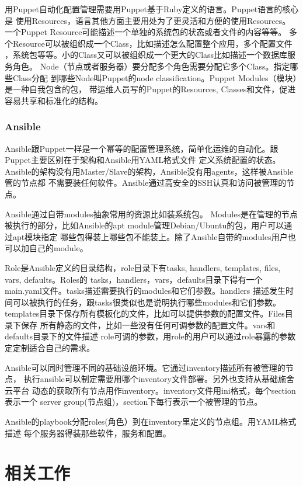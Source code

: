 用Puppet自动化配置管理需要用Puppet基于Ruby定义的语言。Puppet语言的核心是
使用Resources，语言其他方面主要用处为了更灵活和方便的使用Resources。
一个Puppet Resource可能描述一个单独的系统包的状态或者文件的内容等等。
多个Resource可以被组织成一个Class，比如描述怎么配置整个应用，多个配置文件
，系统包等等。小的Class又可以被组织成一个更大的Class比如描述一个数据库服务角色。
Node（节点或者服务器）要分配多个角色需要分配它多个Class。指定哪些Class分配
到哪些Node叫Puppet的node classification。Puppet Modules（模块）是一种自我包含的包，
带运维人员写的Puppet的Resources, Classes和文件，促进容易共享和标准化的结构。

\subsubsection{Ansible}
\label{subsubsec:ansible}
Ansible跟Puppet一样是一个幂等的配置管理系统，简单化运维的自动化。跟Puppet主要区别在于架构和Ansible用YAML格式文件
定义系统配置的状态。Ansible的架构没有用Master/Slave的架构，Ansible没有用agents，这样被Ansible管的节点都
不需要装任何软件。Ansible通过高安全的SSH认真和访问被管理的节点。

Ansible通过自带modules抽象常用的资源比如装系统包。
Modules是在管理的节点被执行的部分，比如Ansible的apt module管理Debian/Ubuntu的包，用户可以通过apt模块指定
哪些包得装上哪些包不能装上。除了Ansible自带的modules用户也可以加自己的module。

Role是Ansible定义的目录结构，role目录下有tasks, handlers, templates, files, vars, defaults。Roles的
tasks，handlers，vars，defaults目录下得有一个main.yaml文件。tasks描述需要执行的modules和它们参数。handlers
描述发生时间可以被执行的任务，跟tasks很类似也是说明执行哪些modules和它们参数。
templates目录下保存所有模板化的文件，比如可以提供参数的配置文件。Files目录下保存
所有静态的文件，比如一些没有任何可调参数的配置文件。vars和defaults目录下的文件描述
role可调的参数，用role的用户可以通过role暴露的参数定定制适合自己的需求。

Ansible可以同时管理不同的基础设施环境。它通过inventory描述所有被管理的节点，
执行ansible可以制定需要用哪个inventory文件部署。另外也支持从基础施舍云平台
动态的获取所有节点用作inventory。inventory文件用ini格式，每个section表示一个
server group(节点组)，section下每行表示一个被管理的节点。

Ansible的playbook分配roles(角色）到在inventory里定义的节点组。用YAML格式描述
每个服务器得装那些软件，服务和配置。



\section{相关工作}
\label{sec:related_work}

